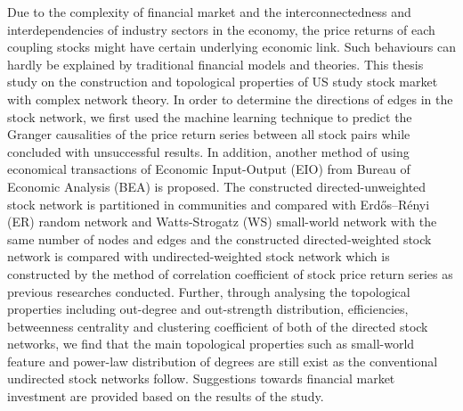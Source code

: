 \abstracttitle
%
{\singlespacing
Due to the complexity of financial market and the interconnectedness and interdependencies of industry sectors in the economy, the price returns of each coupling stocks might have certain underlying economic link. Such behaviours can hardly be explained by traditional financial models and theories. This thesis study on the construction and topological properties of US study stock market with complex network theory. In order to determine the directions of edges in the stock network, we first used the machine learning technique to predict the Granger causalities of the price return series between all stock pairs while concluded with unsuccessful results. In addition, another method of using economical transactions of Economic Input-Output (EIO) from Bureau of Economic Analysis (BEA) is proposed. The constructed directed-unweighted stock network is partitioned in communities and compared with Erdős–Rényi (ER) random network and Watts-Strogatz (WS) small-world network with the same number of nodes and edges and the constructed directed-weighted stock network is compared with undirected-weighted stock network which is constructed by the method of correlation coefficient of stock price return series as previous researches conducted. Further, through analysing the topological properties including out-degree and out-strength distribution, efficiencies, betweenness centrality and clustering coefficient of both of the directed stock networks, we find that the main topological properties such as small-world feature and power-law distribution of degrees are still exist as the conventional undirected stock networks follow. Suggestions towards financial market investment are provided based on the results of the study.
}

